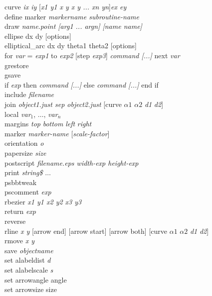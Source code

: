 {\sf curve {\it ix iy }[{\it x1 y1 x y x y ... xn yn}]{\it ex ey }}  \\
{\sf define marker {\it markername  subroutine-name}} \\
{\sf draw {\it name.point [{\it arg1} ... {\it argn}] [name {\it name}]}} \\
{\sf ellipse dx dy [options]} \\
{\sf elliptical\_arc dx dy theta1 theta2 [options]} \\
{\sf for {\it var} = {\it exp1} to {\it exp2} [step {\it exp3}] {\it command [...]} next {\it var}}  \\
{\sf grestore}  \\
{\sf gsave}  \\
{\sf if {\it exp} then {\it command [...]} else {\it command [...]} end if}  \\
{\sf include {\it filename}}  \\
{\sf join {\it object1.just sep object2.just} [curve {\it $\alpha1$} {\it $\alpha2$} {\it d1} {\it d2}]}   \\
{\sf local {\it var}$_1$, $\ldots$, {\it var}$_n$} \\
{\sf margins {\it top} {\it bottom} {\it left} {\it right}} \\
{\sf marker {\it marker-name} [{\it scale-factor}]}  \\
{\sf orientation {\it o}} \\
{\sf papersize {\it size}} \\
{\sf postscript {\it filename.eps  width-exp height-exp}}   \\
{\sf print {\it string\$} $\ldots$} \\
{\sf psbbtweak} \\
{\sf pscomment} {\it exp} \\
{\sf rbezier {\it x1 y1 x2 y2 x3 y3}}  \\
{\sf return} {\it exp}  \\
{\sf reverse }  \\
{\sf rline {\it x y} [arrow end] [arrow start] [arrow both]  [curve {\it $\alpha1$} {\it $\alpha2$} {\it d1} {\it d2}]}   \\
{\sf rmove {\it x y}}  \\
{\sf save {\it objectname}}   \\
{\sf set alabeldist {\it d}}  \\
{\sf set alabelscale {\it s}}  \\
{\sf set arrowangle {\sf angle}}  \\
{\sf set arrowsize {\sf size}}  \\
